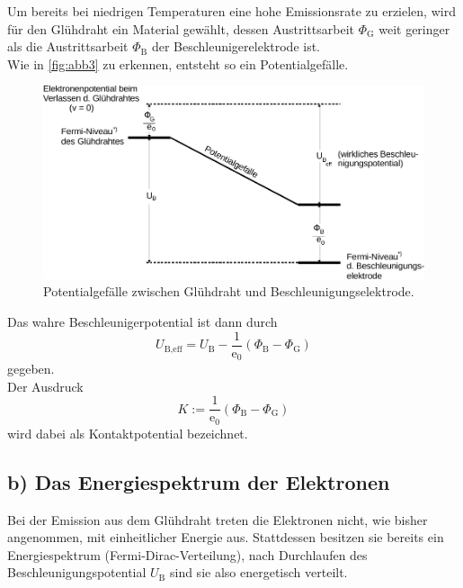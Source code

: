 Um bereits bei niedrigen Temperaturen eine hohe Emissionsrate zu erzielen, wird für den Glühdraht ein Material
gewählt, dessen Austrittsarbeit $\Phi_\text{G}$ weit geringer als die Austrittsarbeit $\Phi_\text{B}$ der
Beschleunigerelektrode ist. \\

Wie in \autoref{fig:abb3} zu erkennen, entsteht so ein Potentialgefälle.

\begin{figure}
    \centering
    \includegraphics{figures/Abb_3.pdf}
    \caption{Potentialgefälle zwischen Glühdraht und Beschleunigungselektrode\cite{ap08}.}
    \label{fig:abb3}
\end{figure}

Das wahre Beschleunigerpotential ist dann durch
\begin{equation}
    U_{\text{B},\text{eff}} = U_\text{B} - \frac{1}{\text{e}_0} (\Phi_\text{B} - \Phi_\text{G})
    \label{eq:Ueff}
\end{equation}
gegeben. \\

Der Ausdruck
\begin{equation*}
    K := \frac{1}{\text{e}_0} (\Phi_\text{B} - \Phi_\text{G})
\end{equation*}
wird dabei als Kontaktpotential bezeichnet.


\subsection*{b) Das Energiespektrum der Elektronen}

Bei der Emission aus dem Glühdraht treten die Elektronen nicht, wie bisher angenommen, mit einheitlicher Energie aus.
Stattdessen besitzen sie bereits ein Energiespektrum (Fermi-Dirac-Verteilung), nach Durchlaufen des Beschleunigungspotential $U_\text{B}$
sind sie also energetisch verteilt. \\

